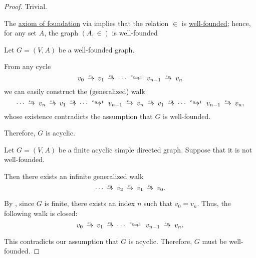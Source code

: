 \begin{proof}
   Trivial.

   The \hyperref[def:zfc/foundation]{axiom of foundation} via  implies that the relation \( {\in} \) is \hyperref[def:well_founded_relation]{well-founded}; hence, for any set \( A \), the graph \( (A, {\in}) \) is well-founded

   Let \( G = (V, A) \) be a well-founded graph.

  From any cycle
  \begin{equation*}
    v_0 \reloset {e_1} \to v_1 \reloset {e_2} \to \cdots \reloset {e_{n-1}} \to v_{n-1} \reloset {e_n} \to v_n
  \end{equation*}
  we can easily construct the (generalized) walk
  \begin{equation*}
    \cdots \reloset {e_n} \to v_n \reloset {e_1} \to v_1 \reloset {e_2} \to \cdots \reloset {e_{n-1}} \to v_{n-1} \reloset {e_n} \to v_n \reloset {e_1} \to v_1 \reloset {e_2} \to \cdots \reloset {e_{n-1}} \to v_{n-1} \reloset {e_n} \to v_n,
  \end{equation*}
  whose existence contradicts the assumption that \( G \) is well-founded.

  Therefore, \( G \) is acyclic.

   Let \( G = (V, A) \) be a finite acyclic simple directed graph. Suppose that it is not well-founded.

  Then there exists an infinite generalized walk
  \begin{equation*}
    \cdots \reloset {e_2} \to v_2 \reloset {e_1} \to v_1 \reloset {e_0} \to v_0.
  \end{equation*}

  By , since \( G \) is finite, there exists an index \( n \) such that \( v_0 = v_n \). Thus, the following walk is closed:
  \begin{equation*}
    v_0 \reloset {e_1} \to v_1 \reloset {e_2} \to \cdots \reloset {e_{n-1}} \to v_{n-1} \reloset {e_n} \to v_n.
  \end{equation*}

  This contradicts our assumption that \( G \) is acyclic. Therefore, \( G \) must be well-founded.
\end{proof}

